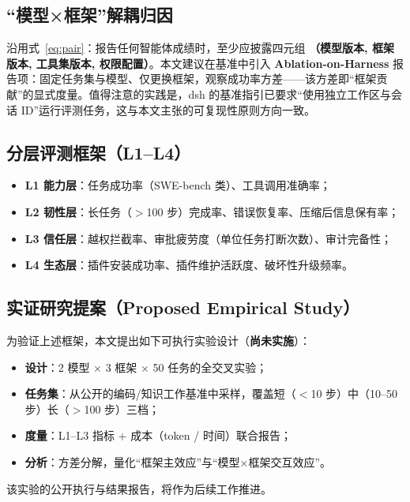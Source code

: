 \documentclass[11pt,a4paper]{ctexart}
\begin{document}
\subsection{“模型×框架”解耦归因}\label{sec:attribution}

沿用式~\eqref{eq:pair}：报告任何智能体成绩时，至少应披露四元组 \textbf{（模型版本, 框架版本, 工具集版本, 权限配置）}。本文建议在基准中引入 \textbf{Ablation-on-Harness} 报告项：固定任务集与模型、仅更换框架，观察成功率方差——该方差即“框架贡献”的显式度量。值得注意的实践是，dsh 的基准指引已要求“使用独立工作区与会话 ID”运行评测任务，这与本文主张的可复现性原则方向一致。

\subsection{分层评测框架（L1--L4）}

\begin{itemize}
  \item \textbf{L1 能力层}：任务成功率（SWE-bench 类）、工具调用准确率；
  \item \textbf{L2 韧性层}：长任务（$>$100 步）完成率、错误恢复率、压缩后信息保有率；
  \item \textbf{L3 信任层}：越权拦截率、审批疲劳度（单位任务打断次数）、审计完备性；
  \item \textbf{L4 生态层}：插件安装成功率、插件维护活跃度、破坏性升级频率。
\end{itemize}

\subsection{实证研究提案（Proposed Empirical Study）}

为验证上述框架，本文提出如下可执行实验设计（\textbf{尚未实施}）：

\begin{itemize}
  \item \textbf{设计}：2 模型 × 3 框架 × 50 任务的全交叉实验；
  \item \textbf{任务集}：从公开的编码/知识工作基准中采样，覆盖短（$<$10 步）中（10--50 步）长（$>$100 步）三档；
  \item \textbf{度量}：L1--L3 指标 + 成本（token / 时间）联合报告；
  \item \textbf{分析}：方差分解，量化“框架主效应”与“模型×框架交互效应”。
\end{itemize}

该实验的公开执行与结果报告，将作为后续工作推进。
\end{document}
